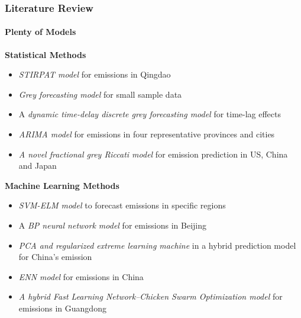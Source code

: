 \documentclass[light]{lutbeamer} %
\begin{document}
\begin{frame}
    \frametitle{Literature Review}
    \framesubtitle{Plenty of Models}
    \begin{minipage}[t][1\textheight]{0.47\textwidth}
        \textbf{Statistical Methods}
        \begin{itemize}
            \item \emph{STIRPAT model} for emissions in Qingdao \cite{wu2018-scenario}
            \item \emph{Grey forecasting model} for small sample data \cite{ju-long1982-control}
            \item A \emph{dynamic time-delay discrete grey forecasting model} for time-lag effects \cite{ye2022-enhanced}
            \item \emph{ARIMA model} for emissions in four representative provinces and cities \cite{ning2021-forecast}
            \item \emph{A novel fractional grey Riccati model} for emission prediction in US, China and Japan\cite{gao2021-novel}
        \end{itemize}
    \end{minipage}
    \hfill
    \begin{minipage}[t][1\textheight]{0.47\textwidth}
        \textbf{Machine Learning Methods}
        \begin{itemize}
            \item \emph{SVM-ELM model} to forecast emissions in specific regions \cite{li2018-forecasting}
            \item A \emph{BP neural network model} for emissions in Beijing \cite{liu2018-regional}
            \item \emph{PCA and regularized extreme learning machine} in a hybrid prediction model for China's emission \cite{sun2017-prediction}
            \item \emph{ENN model} for emissions in China \cite{zhou2019-forecasting}
            \item \emph{A hybrid Fast Learning Network–Chicken Swarm Optimization model} for emissions in Guangdong \cite{ren2021-carbon}
        \end{itemize}
    \end{minipage}
\end{frame}
\end{document}
